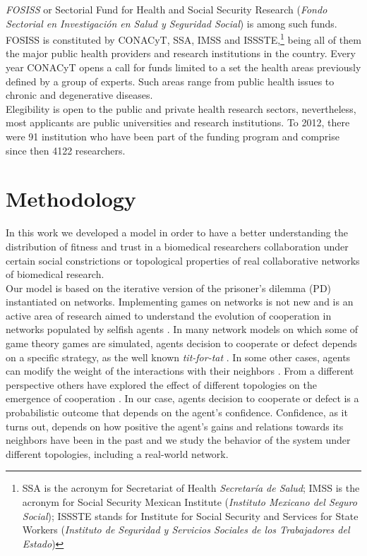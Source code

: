 \emph{FOSISS} or Sectorial Fund for Health and Social Security
Research (\emph{Fondo Sectorial en Investigaci\'on en Salud y
  Seguridad Social}) is among such funds. FOSISS is constituted by
CONACyT, SSA, IMSS and ISSSTE,\footnote{SSA is the acronym for
  Secretariat of Health \emph{Secretar\'ia de Salud}; IMSS is the
  acronym for Social Security Mexican Institute (\emph{Instituto
    Mexicano del Seguro Social}); ISSSTE stands for Institute for
  Social Security and Services for State Workers (\emph{Instituto de
    Seguridad y Servicios Sociales de los Trabajadores del Estado})}
being all of them the major public health providers and research
institutions in the country. Every year CONACyT opens a call for funds
limited to a set the health areas previously defined by a group of
experts. Such areas range from public health issues to chronic and
degenerative diseases.\\

Elegibility is open to the public and private health research
sectors, nevertheless, most applicants are public universities and
research institutions. To 2012, there were 91 institution who have
been part of the funding program and comprise since then 4122
researchers.

\section{Methodology}
\label{sec:2}
In this work we developed a model in order to have a better
understanding the distribution of fitness and trust in a biomedical
researchers collaboration under certain social constrictions or
topological properties of real collaborative networks of biomedical
research.\\

Our model is based on the iterative version of the prisoner's dilemma (PD)
instantiated on networks. Implementing games on networks is not new
and is an active area of research aimed to understand the evolution of
cooperation in networks populated by selfish agents
\cite{Szabo2007,Nowak1992,Nowak2006}. In many network models on which some of game
theory games are simulated, agents decision to cooperate or defect
depends on a specific strategy, as the well known \textit{tit-for-tat}
\cite{Axelrod2006,Nowak2011}. In some other cases, agents can modify the weight
of the interactions with their neighbors \cite{Santos2006}. From a different perspective
others have explored the effect of different topologies on the
emergence of cooperation \cite{Santos2005,Hauert2004}. In our case, agents decision
to cooperate or defect is a probabilistic outcome that depends on the
agent's confidence. Confidence, as it turns out, depends on how
positive the agent's gains and relations towards its neighbors
have been in the past and we study the behavior of the system under
different topologies, including a real-world network.\\ 

